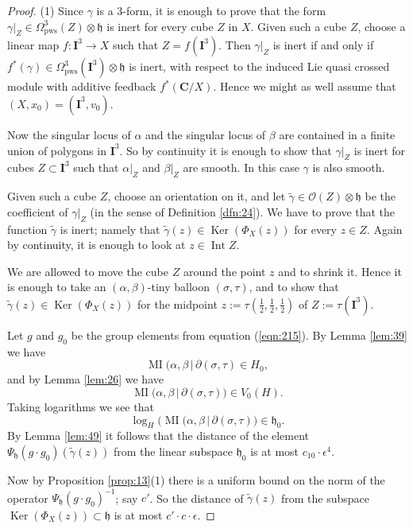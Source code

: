 \documentclass[10pt, a4paper]{amsart}
\theoremstyle{definition}
\numberwithin{equation}{section}
\newcommand{\opn}{\operatorname}
\newcommand{\mfrak}[1]{\mathfrak{#1}}
\newcommand{\mcal}[1]{\mathcal{#1}}
\newcommand{\mbf}[1]{\mathbf{#1}}
\newcommand{\mrm}[1]{\mathrm{#1}}
\newcommand{\smfrac}[2]{{\textstyle \frac{#1}{#2}}}
\newcommand{\til}[1]{\tilde{#1}}
\renewcommand{\vert}{\, | \,}
\newcommand{\h}{\mfrak{h}}
\newcommand{\lb}{\linebreak}
\begin{document}
\begin{proof}
(1) Since $\gamma$ is a $3$-form, it is enough to prove that the form 
$\gamma|_Z \in \Omega_{\mrm{pws}}^3(Z) \otimes \h$
is inert for every cube $Z$ in $X$. 
Given such a cube $Z$, choose a linear map $f : \mbf{I}^3 \to X$
such that $Z = f(\mbf{I}^3)$. Then $\gamma|_Z$ is inert if and only if
$f^*(\gamma) \in \Omega^3_{\mrm{pws}}(\mbf{I}^3) \otimes \h$
is inert, with respect to the induced Lie quasi crossed module with additive
feedback $f^*(\mbf{C} / X)$. Hence we might as well assume that 
$(X, x_0) = (\mbf{I}^3, v_0)$. 

Now the singular locus of $\alpha$ and the singular locus of $\beta$ are
contained in a finite union of polygons in $\mbf{I}^3$. So by continuity it is
enough to show that $\gamma|_Z$ is inert for cubes
$Z \subset \mbf{I}^3$ such that $\alpha|_Z$ and $\beta|_Z$ are smooth. 
In this case $\gamma$ is also smooth. 

Given such a cube $Z$, choose an orientation on it, and let
$\til{\gamma} \in \mcal{O}(Z) \otimes \h$ be the coefficient of 
$\gamma|_Z$ (in the sense of Definition \ref{dfn:24}). 
We have to prove that the function $\til{\gamma}$ is inert; namely that 
$\til{\gamma}(z) \in \opn{Ker}(\Phi_X(z))$ for every $z \in Z$. 
Again by continuity, it is enough to look at $z \in \opn{Int} Z$.

We are allowed to move the cube $Z$ around the point $z$ and to shrink it. 
Hence it is enough
to take an  $(\alpha, \beta)$-tiny balloon $(\sigma, \tau)$, and 
to show that $\til{\gamma}(z) \in \opn{Ker}(\Phi_X(z))$ for the midpoint
$z := \tau(\smfrac{1}{2}, \smfrac{1}{2}, \smfrac{1}{2})$ of
$Z := \tau(\mbf{I}^3)$. 

Let $g$ and $g_0$ be the group elements from equation
(\ref{eqn:215}). By Lemma \ref{lem:39} we have 
\[ \opn{MI} \bigl( \alpha, \beta \vert \partial (\sigma, \tau) \in H_0 , \]
and by Lemma \ref{lem:26} we have
\[ \opn{MI} \bigl( \alpha, \beta \vert 
\partial (\sigma, \tau) \bigr) \in V_0(H) . \]
Taking logarithms we see that 
\[ \log_H \bigl( \opn{MI} \bigl( \alpha, \beta \vert \partial (\sigma, \tau)
\bigr) \in \h_0 . \]
By Lemma \ref{lem:49} it follows that the distance of the
element \lb $\Psi_{\h}(g \cdot g_0)(\til{\gamma}(z))$ from the linear subspace
$\h_0$ is at most $c_{10} \cdot \epsilon^4$.

Now by Proposition \ref{prop:13}(1) there is a uniform bound on the norm of the
operator $\Psi_{\h}(g \cdot g_0)^{-1}$; say $c'$. So the distance of
$\til{\gamma}(z)$
from the subspace
$\opn{Ker}(\Phi_X(z)) \subset \h$
is at most $c' \cdot c \cdot \epsilon$.


\end{proof}
\end{document}
